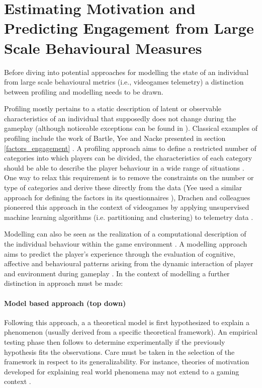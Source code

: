 \section{Estimating Motivation and Predicting Engagement from Large Scale Behavioural Measures}
\label{estpred_motivation_engagement}
Before diving into potential approaches for modelling the state of an individual from large scale behavioural metrics (i.e., videogames telemetry) a distinction between profiling and modelling needs to be drawn. 

Profiling mostly pertains to a static description of latent or observable characteristics of an individual that supposedly does not change during the gameplay \cite{yannakakis2013player} (although noticeable exceptions can be found in \cite{sifa2013behavior, pirker2016playstyles, aung2018predicting}). Classical examples of profiling include the work of Bartle, Yee and Nacke presented in section \ref{factors_engagement} \cite{bartle1996hearts, yee2006motivations, nacke2011brainhex}. A profiling approach aims to define a restricted number of categories into which players can be divided, the characteristics of each category should be able to describe the player behaviour in a wide range of situations \cite{yannakakis2013player, van2009psychologically, van2011games}. One way to relax this requirement is to remove the constraints on the number or type of categories and derive these directly from the data (Yee used a similar approach for defining the factors in its questionnaires \cite{yee2006motivations}), Drachen and colleagues pioneered this approach in the context of videogames by applying unsupervised machine learning algorithms (i.e. partitioning and clustering) to telemetry data \cite{tychsen2008defining,drachen2009player, drachen2012guns}. 

Modelling can also be seen as the realization of a computational description of the individual behaviour within the game environment \cite{yannakakis2013player}. A modelling approach aims to predict the player’s experience through the evaluation of cognitive, affective and behavioural patterns arising from the dynamic interaction of player and environment during gameplay \cite{yannakakis2013player}. In the context of modelling a further distinction in approach must be made:

\paragraph*{Model based approach (top down)} Following this approach, a  a theoretical model is first hypothesized to explain a phenomenon (usually derived from a specific theoretical framework). An empirical testing phase then follows to determine experimentally if the previously hypothesis fits the observations. Care must be taken in the selection of the framework in respect to its generalizability. For instance, theories of motivation developed for explaining real world phenomena may not extend to a gaming context \cite{yannakakis2013player}.

